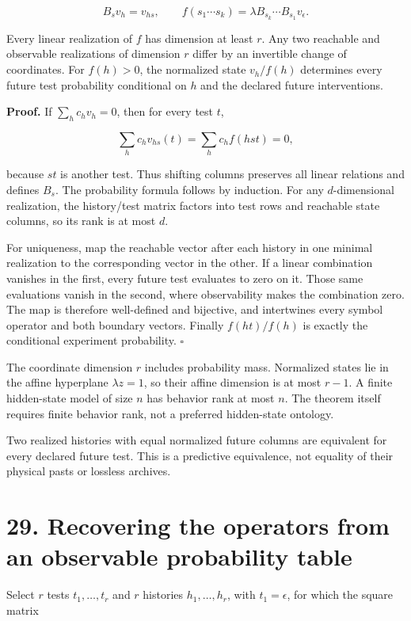\documentclass[11pt,letterpaper]{article}
\begin{document}
\[
B_sv_h=v_{hs},\qquad
f(s_1\cdots s_k)=\lambda B_{s_k}\cdots B_{s_1}v_\epsilon.
\]

Every linear realization of \(f\) has dimension at least \(r\). Any two
reachable and observable realizations of dimension \(r\) differ by an
invertible change of coordinates. For \(f(h)>0\), the normalized state
\(v_h/f(h)\) determines every future test probability conditional on
\(h\) and the declared future interventions.

\textbf{Proof.} If \(\sum_hc_hv_h=0\), then for every test \(t\),

\[
\sum_hc_hv_{hs}(t)=\sum_hc_hf(hst)=0,
\]

because \(st\) is another test. Thus shifting columns preserves all
linear relations and defines \(B_s\). The probability formula follows by
induction. For any \(d\)-dimensional realization, the history/test
matrix factors into test rows and reachable state columns, so its rank
is at most \(d\).

For uniqueness, map the reachable vector after each history in one
minimal realization to the corresponding vector in the other. If a
linear combination vanishes in the first, every future test evaluates to
zero on it. Those same evaluations vanish in the second, where
observability makes the combination zero. The map is therefore
well-defined and bijective, and intertwines every symbol operator and
both boundary vectors. Finally \(f(ht)/f(h)\) is exactly the conditional
experiment probability. \(\square\)

The coordinate dimension \(r\) includes probability mass. Normalized
states lie in the affine hyperplane \(\lambda z=1\), so their affine
dimension is at most \(r-1\). A finite hidden-state model of size \(n\)
has behavior rank at most \(n\). The theorem itself requires finite
behavior rank, not a preferred hidden-state ontology.

Two realized histories with equal normalized future columns are
equivalent for every declared future test. This is a predictive
equivalence, not equality of their physical pasts or lossless archives.

\section{29. Recovering the operators from an observable probability
table}\label{recovering-the-operators-from-an-observable-probability-table}

Select \(r\) tests \(t_1,\ldots,t_r\) and \(r\) histories
\(h_1,\ldots,h_r\), with \(t_1=\epsilon\), for which the square matrix
\end{document}
